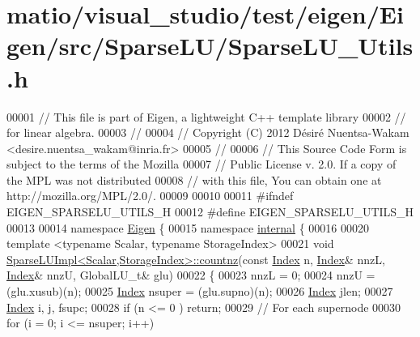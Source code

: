\hypertarget{matio_2visual__studio_2test_2eigen_2_eigen_2src_2_sparse_l_u_2_sparse_l_u___utils_8h_source}{}\section{matio/visual\+\_\+studio/test/eigen/\+Eigen/src/\+Sparse\+L\+U/\+Sparse\+L\+U\+\_\+\+Utils.h}
\label{matio_2visual__studio_2test_2eigen_2_eigen_2src_2_sparse_l_u_2_sparse_l_u___utils_8h_source}

\begin{DoxyCode}
00001 \textcolor{comment}{// This file is part of Eigen, a lightweight C++ template library}
00002 \textcolor{comment}{// for linear algebra.}
00003 \textcolor{comment}{//}
00004 \textcolor{comment}{// Copyright (C) 2012 Désiré Nuentsa-Wakam <desire.nuentsa\_wakam@inria.fr>}
00005 \textcolor{comment}{//}
00006 \textcolor{comment}{// This Source Code Form is subject to the terms of the Mozilla}
00007 \textcolor{comment}{// Public License v. 2.0. If a copy of the MPL was not distributed}
00008 \textcolor{comment}{// with this file, You can obtain one at http://mozilla.org/MPL/2.0/.}
00009 
00010 
00011 \textcolor{preprocessor}{#ifndef EIGEN\_SPARSELU\_UTILS\_H}
00012 \textcolor{preprocessor}{#define EIGEN\_SPARSELU\_UTILS\_H}
00013 
00014 \textcolor{keyword}{namespace }\hyperlink{namespace_eigen}{Eigen} \{
00015 \textcolor{keyword}{namespace }\hyperlink{namespaceinternal}{internal} \{
00016 
00020 \textcolor{keyword}{template} <\textcolor{keyword}{typename} Scalar, \textcolor{keyword}{typename} StorageIndex>
00021 \textcolor{keywordtype}{void} \hyperlink{group___sparse_l_u___module_acbede3f259186d48ad42ca093f80b64b}{SparseLUImpl<Scalar,StorageIndex>::countnz}(\textcolor{keyword}{const} 
      \hyperlink{namespace_eigen_a62e77e0933482dafde8fe197d9a2cfde}{Index} n, \hyperlink{namespace_eigen_a62e77e0933482dafde8fe197d9a2cfde}{Index}& nnzL, \hyperlink{namespace_eigen_a62e77e0933482dafde8fe197d9a2cfde}{Index}& nnzU, GlobalLU\_t& glu)
00022 \{
00023  nnzL = 0; 
00024  nnzU = (glu.xusub)(n); 
00025  \hyperlink{namespace_eigen_a62e77e0933482dafde8fe197d9a2cfde}{Index} nsuper = (glu.supno)(n); 
00026  \hyperlink{namespace_eigen_a62e77e0933482dafde8fe197d9a2cfde}{Index} jlen; 
00027  \hyperlink{namespace_eigen_a62e77e0933482dafde8fe197d9a2cfde}{Index} i, j, fsupc;
00028  \textcolor{keywordflow}{if} (n <= 0 ) \textcolor{keywordflow}{return}; 
00029  \textcolor{comment}{// For each supernode}
00030  \textcolor{keywordflow}{for} (i = 0; i <= nsuper; i++)

\end{DoxyCode}
